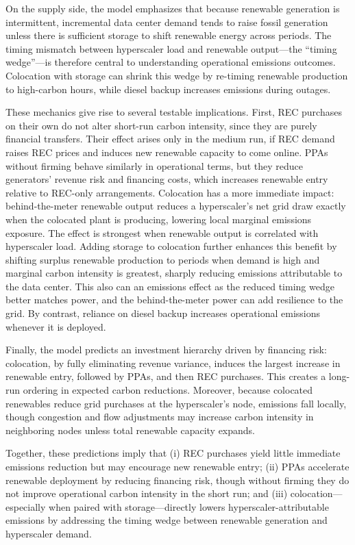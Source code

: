\documentclass[a4paper,fleqn,longmktitle]{cas-sc}
\begin{document}
On the supply side, the model emphasizes that because renewable generation is intermittent, incremental data center demand tends to raise fossil generation unless there is sufficient storage to shift renewable energy across periods. The timing mismatch between hyperscaler load and renewable output—the “timing wedge”—is therefore central to understanding operational emissions outcomes. Colocation with storage can shrink this wedge by re-timing renewable production to high-carbon hours, while diesel backup increases emissions during outages.

These mechanics give rise to several testable implications. First, REC purchases on their own do not alter short-run carbon intensity, since they are purely financial transfers. Their effect arises only in the medium run, if REC demand raises REC prices and induces new renewable capacity to come online. PPAs without firming behave similarly in operational terms, but they reduce generators’ revenue risk and financing costs, which increases renewable entry relative to REC-only arrangements. Colocation has a more immediate impact: behind-the-meter renewable output reduces a hyperscaler’s net grid draw exactly when the colocated plant is producing, lowering local marginal emissions exposure. The effect is strongest when renewable output is correlated with hyperscaler load. Adding storage to colocation further enhances this benefit by shifting surplus renewable production to periods when demand is high and marginal carbon intensity is greatest, sharply reducing emissions attributable to the data center. This also can an emissions effect as the reduced timing wedge better matches power, and the behind-the-meter power can add resilience to the grid. By contrast, reliance on diesel backup increases operational emissions whenever it is deployed.

Finally, the model predicts an investment hierarchy driven by financing risk: colocation, by fully eliminating revenue variance, induces the largest increase in renewable entry, followed by PPAs, and then REC purchases. This creates a long-run ordering in expected carbon reductions. Moreover, because colocated renewables reduce grid purchases at the hyperscaler’s node, emissions fall locally, though congestion and flow adjustments may increase carbon intensity in neighboring nodes unless total renewable capacity expands.

Together, these predictions imply that (i) REC purchases yield little immediate emissions reduction but may encourage new renewable entry; (ii) PPAs accelerate renewable deployment by reducing financing risk, though without firming they do not improve operational carbon intensity in the short run; and (iii) colocation—especially when paired with storage—directly lowers hyperscaler-attributable emissions by addressing the timing wedge between renewable generation and hyperscaler demand.
\end{document}
